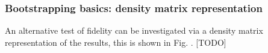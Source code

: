\subsubsection{Bootstrapping basics: density matrix representation}

An alternative test of fidelity can be investigated via a density matrix representation of the results, this is shown in Fig. . [TODO]